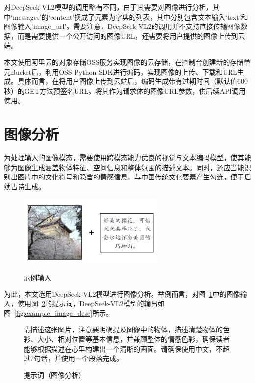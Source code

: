 对DeepSeek-VL2模型的调用略有不同，由于其需要对图像进行分析，其中`messages'的`content'换成了元素为字典的列表，其中分别包含文本输入`text'和图像输入`image\_url'。需要注意，DeepSeek-VL2的调用并不支持直接传输图像数据，而是需要提供一个公开访问的图像URL，还需要将用户提供的图像上传到云端。

本文使用阿里云的对象存储OSS服务实现图像的云存储，在控制台创建新的存储单元Bucket后，利用OSS Python SDK进行编码，实现图像的上传、下载和URL生成。具体而言，在将用户图像上传到云端后，编码生成带有过期时间（默认值600秒）的GET方法预签名URL。将其作为请求体的图像URL参数，供后续API调用使用。


\section{图像分析} \label{sec:image_analysis}

为处理输入的图像模态，需要使用跨模态能力优良的视觉与文本编码模型，使其能够为图像生成涵盖物体特征、空间信息和整体氛围的描述文本。同时，还应当能识别出图片中的文化符号和隐含的情感信息，与中国传统文化要素产生勾连，便于后续古诗生成。

\begin{figure}[ht]
  \centering
  \includegraphics[width=0.65\textwidth]
  {figures/示例输入.png}\\
  \caption{示例输入}
  \label{fig:example_input} %
\end{figure}


为此，本文选用DeepSeek-VL2模型进行图像分析。举例而言，对图~\ref{fig:example_input}中的图像输入，使用图~\ref{fig:prompt_image_analysis}的提示词，DeepSeek-VL2模型的输出如图~\ref{fig:example_image_desc}所示。

\begin{figure}[ht]
  \begin{tcolorbox}[
      colback=white, %
      colframe=black, 
      boxrule=1pt,        %
      arc=0mm             %
      ]
      \kaishu 请描述这张图片，注意要明确提及图像中的物体，描述清楚物体的色彩、大小、相对位置等基本信息，并兼顾整体的情感色彩，确保读者能够根据描述在心里构建出一个清晰的画面。请确保使用中文，不超过7句话，并使用一个段落完成。
  \end{tcolorbox}
  \caption{提示词（图像分析）}
  \label{fig:prompt_image_analysis} %
\end{figure}

